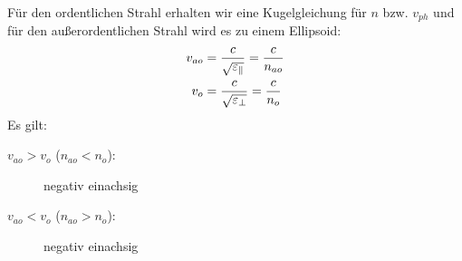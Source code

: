 Für den ordentlichen Strahl erhalten wir eine Kugelgleichung für $n$
bzw. $v_{ph}$ und
für den außerordentlichen Strahl wird es zu einem Ellipsoid:
\begin{align*}
  v_{ao} &= \frac{c}{\sqrt{\varepsilon_\parallel}} = \frac{c}{n_{ao}}\\
  v_o &= \frac{c}{\sqrt{\varepsilon_\bot}} = \frac{c}{n_{o}}\\
\end{align*}
Es gilt:
\begin{description}
\item[$v_{ao}>v_o$ ($n_{ao}<n_o$):] negativ einachsig
\item[$v_{ao}<v_o$ ($n_{ao}>n_o$):] negativ einachsig
\end{description}


